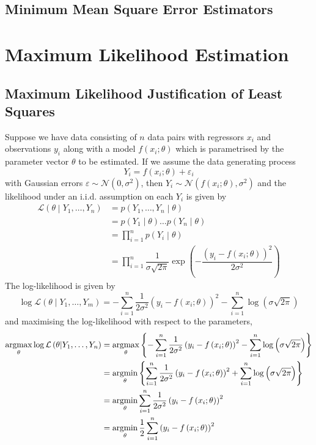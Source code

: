 \documentclass[11pt]{report} %
\begin{document}
\subsection{Minimum Mean Square Error Estimators}

\section{Maximum Likelihood Estimation}

\subsection{Maximum Likelihood Justification of Least Squares}

Suppose we have data consisting of $n$ data pairs with regressors $x_{i}$ and observations $y_{i}$ along with a model $f\left(x_{i}; \theta\right)$ which is parametrised by the parameter vector $\theta$ to be estimated. If we assume the data generating process
\begin{equation}
Y_{i} = f\left(x_{i}; \theta\right) + \varepsilon_{i}
\end{equation}
with Gaussian errors $\varepsilon \sim \mathcal{N}\left(0, \sigma^{2}\right)$, then $Y_{i} \sim \mathcal{N}\left(f\left(x_{i}; \theta\right), \sigma^{2}\right)$ and the likelihood under an i.i.d. assumption on each $Y_{i}$ is given by
\begin{align}
\mathcal{L}\left(\theta\middle|Y_{1}, \dots, Y_{n}\right) &= p\left(Y_{1}, \dots, Y_{n}\middle|\theta\right) \\
&= p\left(Y_{1}\middle|\theta\right)\dots p\left(Y_{n}\middle|\theta\right) \\
&= \prod_{i = 1}^{n}p\left(Y_{i}\middle|\theta\right) \\
&= \prod_{i = 1}^{n}\dfrac{1}{\sigma\sqrt{2\pi}}\exp\left(-\dfrac{\left(y_{i} - f\left(x_{i};\theta\right)\right)^{2}}{2\sigma^{2}}\right)
\end{align}
The log-likelihood is given by
\begin{equation}
\log\mathcal{L}\left(\theta\middle|Y_{1}, \dots, Y_{m}\right) = -\sum_{i = 1}^{n}\dfrac{1}{2\sigma^{2}}\left(y_{i} - f\left(x_{i};\theta\right)\right)^{2} - \sum_{i = 1}^{n}\log\left(\sigma\sqrt{2\pi}\right)
\end{equation}
and maximising the log-likelihood with respect to the parameters,
\begin{align}
\operatorname*{argmax}_{\theta}\log\mathcal{L}\left(\theta\middle|Y_{1}, \dots, Y_{n}\right) &= \operatorname*{argmax}_{\theta}\left\{-\sum_{i = 1}^{n}\dfrac{1}{2\sigma^{2}}\left(y_{i} - f\left(x_{i};\theta\right)\right)^{2} - \sum_{i = 1}^{n}\log\left(\sigma\sqrt{2\pi}\right)\right\} \\
&= \operatorname*{argmin}_{\theta}\left\{\sum_{i = 1}^{n}\dfrac{1}{2\sigma^{2}}\left(y_{i} - f\left(x_{i};\theta\right)\right)^{2} + \sum_{i = 1}^{n}\log\left(\sigma\sqrt{2\pi}\right)\right\} \\
&= \operatorname*{argmin}_{\theta}\sum_{i = 1}^{n}\dfrac{1}{2\sigma^{2}}\left(y_{i} - f\left(x_{i};\theta\right)\right)^{2} \\
&= \operatorname*{argmin}_{\theta}\dfrac{1}{2}\sum_{i = 1}^{n}\left(y_{i} - f\left(x_{i};\theta\right)\right)^{2}
\end{align}
\end{document}
